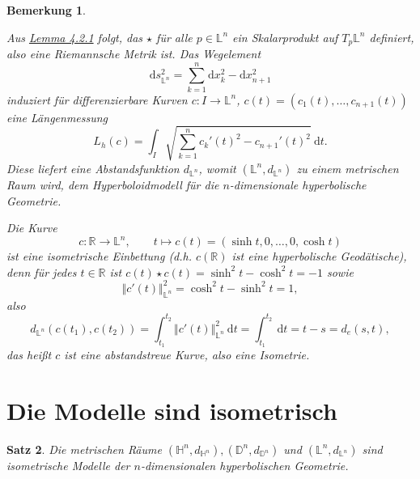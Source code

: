 \documentclass[11pt]{book}
\numberwithin{dummy}{section}
\newtheorem{theorem}{Satz}[section]
\newtheorem{remark}[theorem]{Bemerkung}
\theoremstyle{nonumberbreak}
\newcommand{\Loid}{\mathbb{L}}
\newcommand{\R}{\mathbb{R}}
\newcommand{\He}{\mathbb{H}}
\newcommand{\D}{\mathbb{D}}
\newcommand{\la}{\longrightarrow}
\begin{document}
\begin{spacing}{1.4}
\begin{remark}
\begin{compactenum}
\item Aus \hyperlink{lemmavierzweieins}{Lemma 4.2.1} folgt, das $\star$ für alle $p \in \Loid^n$ ein Skalarprodukt auf $T_p\Loid^n$ definiert, also eine Riemannsche Metrik ist. Das Wegelement
$$\mathrm{d}s_{\Loid^n}^2 = \sum_{k=1}^n \mathrm{d}x_k^2 - \mathrm{d}x_{n+1}^2$$
induziert für differenzierbare Kurven $c: I \la \Loid^n$, $c(t) = (c_1(t), \ldots, c_{n+1}(t))$ eine Längenmessung
$$L_h(c) = \int_I \sqrt{ \sum_{k=1}^n c_k'(t)^2 - c_{n+1}'(t)^2} \ \mathrm{d}t.$$
Diese liefert eine Abstandsfunktion $d_{\Loid^n}$, womit $(\Loid^n, d_{\Loid^n})$ zu einem metrischen Raum wird, dem Hyperboloidmodell für die $n$-dimensionale hyperbolische Geometrie.
\item Die Kurve
$$c: \R \la \Loid^n, \qquad t \mapsto c(t) = \left( \sinh t, 0, \ldots, 0 , \cosh t\right)$$
ist eine isometrische Einbettung (d.h. $c(\R)$ ist eine hyperbolische Geodätische), denn für jedes $t\in \R$ ist $c(t) \star c(t) = \sinh^2 t - \cosh^2 t = -1$ sowie
$$\Vert c'(t)\Vert_{\Loid^n}^2 = \cosh^2 t - \sinh^2 t = 1,$$
also 
$$d_{\Loid^n}(c(t_1), c(t_2)) = \int_{t_1}^{t_2} \Vert c'(t) \Vert _{\Loid^n}^2  \ \mathrm{d}t = \int_{t_1}^{t_2} \ \mathrm{d}t = t - s = d_e(s,t),$$
das heißt $c$ ist eine abstandstreue Kurve, also eine Isometrie.

\end{compactenum}

\end{remark}













 



\section{Die Modelle sind isometrisch} %




\hypertarget{satzvierdreieins}{}    %
\begin{theorem}
Die metrischen Räume $(\He^n, d_{\He^n}), (\D^n, d_{\D^n})$ und $(\Loid^n, d_{\Loid^n})$ sind isometrische Modelle der $n$-dimensionalen hyperbolischen Geometrie.


\end{theorem}
\end{spacing}
\end{document}
